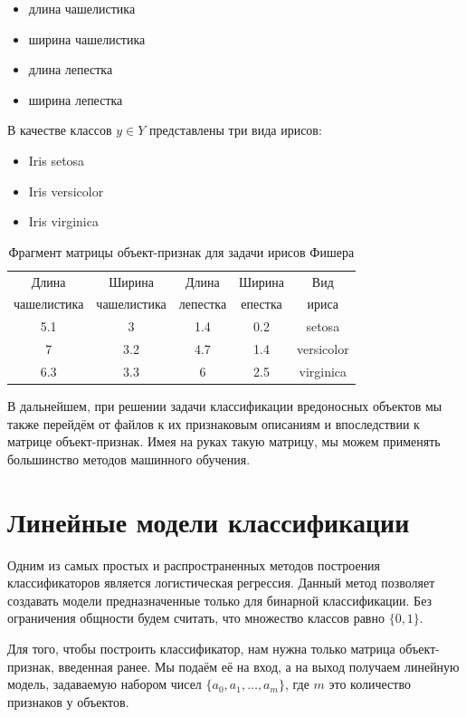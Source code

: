 \begin{itemize}
\item длина чашелистика
\item ширина чашелистика
\item длина лепестка
\item ширина лепестка
\end{itemize}

В качестве классов $y \in Y$ представлены три вида ирисов:
\begin{itemize}
\item Iris setosa
\item Iris versicolor
\item Iris virginica 
\end{itemize}


\begin{table}[ht]
\caption{Фрагмент матрицы объект-признак для задачи ирисов Фишера}
\label{tab_weight}
\centering
    \begin{tabular}{|c|c|c|c|c|}
    \hline Длина  & Ширина  & Длина  & Ширина  & Вид  \\
    чашелистика & чашелистика & лепестка & епестка & ириса \\
    \hline 5.1 & 3 & 1.4 & 0.2 & setosa  \\
    \hline 7 & 3.2 & 4.7 & 1.4 & versicolor  \\
    \hline 6.3 & 3.3 & 6 & 2.5 & virginica  \\
    \hline
    \end{tabular}
\end{table}

В дальнейшем, при решении задачи классификации вредоносных объектов мы также перейдём от файлов к их признаковым описаниям и впоследствии к матрице объект-признак.
Имея на руках такую матрицу, мы можем применять большинство методов машинного обучения.

\section{Линейные модели классификации}

Одним из самых простых и распространенных методов построения классификаторов является логистическая регрессия. Данный метод позволяет создавать модели предназначенные только для бинарной классификации. Без ограничения общности будем считать, что множество классов равно $\{0, 1\}$.

Для того, чтобы построить классификатор, нам нужна только матрица объект-признак, введенная ранее. Мы подаём её на вход, а на выход получаем линейную модель, задаваемую набором чисел $\{a_0, a_1,…, a_m\}$, где $m$ это количество признаков у объектов. 

